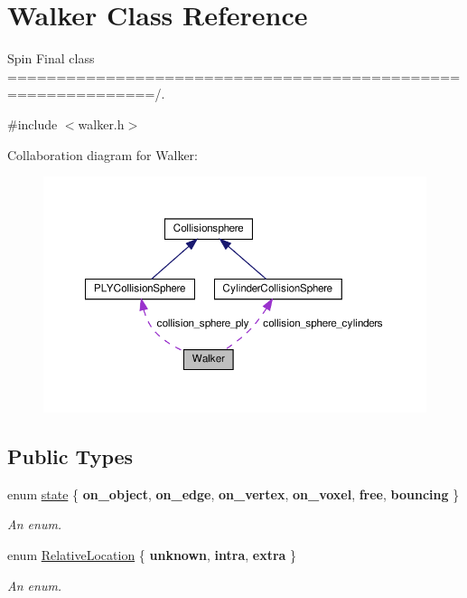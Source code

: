 \hypertarget{class_walker}{}\section{Walker Class Reference}
\label{class_walker}


Spin Final class =============================================================/.  




{\ttfamily \#include $<$walker.\+h$>$}



Collaboration diagram for Walker\+:\nopagebreak
\begin{figure}[H]
\begin{center}
\leavevmode
\includegraphics[width=350pt]{class_walker__coll__graph}
\end{center}
\end{figure}
\subsection*{Public Types}
\begin{DoxyCompactItemize}
\item 
enum \hyperlink{class_walker_afcad3f5c11d0bd045de22fb0347dc44c}{state} \{ \newline
{\bfseries on\+\_\+object}, 
{\bfseries on\+\_\+edge}, 
{\bfseries on\+\_\+vertex}, 
{\bfseries on\+\_\+voxel}, 
\newline
{\bfseries free}, 
{\bfseries bouncing}
 \}\begin{DoxyCompactList}\small\item\em An enum. \end{DoxyCompactList}
\item 
enum \hyperlink{class_walker_a24246136a10754791b05cb570dbb8417}{Relative\+Location} \{ {\bfseries unknown}, 
{\bfseries intra}, 
{\bfseries extra}
 \}\begin{DoxyCompactList}\small\item\em An enum. \end{DoxyCompactList}
\end{DoxyCompactItemize}

